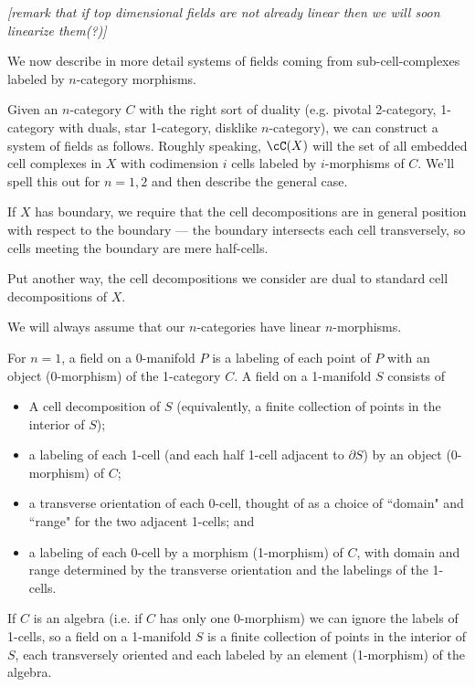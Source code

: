 \documentclass[11pt,leqno]{amsart}
\def\bd{\partial}
\def\nn#1{{{\it \small [#1]}}}
\begin{document}
\nn{remark that if top dimensional fields are not already linear
then we will soon linearize them(?)}

We now describe in more detail systems of fields coming from sub-cell-complexes labeled
by $n$-category morphisms.

Given an $n$-category $C$ with the right sort of duality
(e.g. pivotal 2-category, 1-category with duals, star 1-category, disklike $n$-category),
we can construct a system of fields as follows.
Roughly speaking, $\cC(X)$ will the set of all embedded cell complexes in $X$
with codimension $i$ cells labeled by $i$-morphisms of $C$.
We'll spell this out for $n=1,2$ and then describe the general case.

If $X$ has boundary, we require that the cell decompositions are in general
position with respect to the boundary --- the boundary intersects each cell
transversely, so cells meeting the boundary are mere half-cells.

Put another way, the cell decompositions we consider are dual to standard cell
decompositions of $X$.

We will always assume that our $n$-categories have linear $n$-morphisms.

For $n=1$, a field on a 0-manifold $P$ is a labeling of each point of $P$ with
an object (0-morphism) of the 1-category $C$.
A field on a 1-manifold $S$ consists of
\begin{itemize}
    \item A cell decomposition of $S$ (equivalently, a finite collection
of points in the interior of $S$);
    \item a labeling of each 1-cell (and each half 1-cell adjacent to $\bd S$)
by an object (0-morphism) of $C$;
    \item a transverse orientation of each 0-cell, thought of as a choice of
``domain" and ``range" for the two adjacent 1-cells; and
    \item a labeling of each 0-cell by a morphism (1-morphism) of $C$, with
domain and range determined by the transverse orientation and the labelings of the 1-cells.
\end{itemize}

If $C$ is an algebra (i.e. if $C$ has only one 0-morphism) we can ignore the labels
of 1-cells, so a field on a 1-manifold $S$ is a finite collection of points in the
interior of $S$, each transversely oriented and each labeled by an element (1-morphism)
of the algebra.

\medskip
\end{document}
